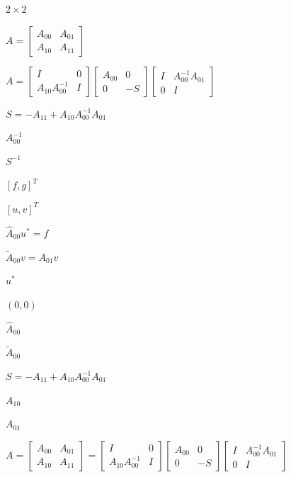 \documentclass{article}
\begin{document}
$ 2\times 2 $
\pagebreak

$ A = \left[\begin{array}{cc}
          A_{00} & A_{01} \\
          A_{10} & A_{11}
          \end{array}\right] $
\pagebreak

$A = \left[ \begin{array}{cc}
I & 0  \\
A_{10} A_{00}^{-1} & I
\end{array} \right]
\left[ \begin{array}{cc}
A_{00} & 0  \\
0 & -S
\end{array} \right]
\left[ \begin{array}{cc}
I &  A_{00}^{-1} A_{01} \\
0 & I
\end{array} \right]$
\pagebreak

$ S=-A_{11}+A_{10} A_{00}^{-1} A_{01} $
\pagebreak

$ A_{00}^{-1} $
\pagebreak

$ S^{-1} $
\pagebreak

$[f, g]^T$
\pagebreak

$[u,v]^T$
\pagebreak

$\hat{A}_{00} u^* = f$
\pagebreak

$\tilde{A}_{00} v = A_{01} v$
\pagebreak

$u^*$
\pagebreak

$(0,0)$
\pagebreak

$\hat{A}_{00}$
\pagebreak

$\tilde{A}_{00}$
\pagebreak

$ S = -A_{11} + A_{10}
A_{00}^{-1} A_{01} $
\pagebreak

$ A_{10} $
\pagebreak

$ A_{01} $
\pagebreak

$   A = \left[
   \begin{array}{cc}
   A_{00} & A_{01} \\
   A_{10} & A_{11}
   \end{array}
   \right]
   = \left[
   \begin{array}{cc}
   I & 0  \\
   A_{10} A_{00}^{-1} & I
   \end{array}
   \right]
   \left[
   \begin{array}{cc}
   A_{00} & 0  \\
   0 & -S
   \end{array}
   \right]
   \left[
   \begin{array}{cc}
   I &  A_{00}^{-1} A_{01} \\
   0 & I
   \end{array}
   \right]
$
\pagebreak
\end{document}
